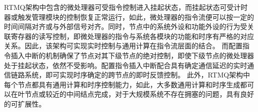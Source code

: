RTMQ架构中包含的微处理器可受指令控制进入挂起状态，而挂起状态可受计时器或触发管理模块的控制恢复正常运行，如此，微处理器的指令流便可以按一定的时间间隔对齐或与外部信号对齐。同时，节点中的系统外设和功能外设的行为受关联寄存器的读写控制，即微处理器的指令与系统各模块的功能和时序有严格的对应关系。因此，该架构可实现实时控制与通用计算在指令流层面的结合。
而配置指令插入中断的机制确保了节点对其下级节点的绝对控制，即使下级节点的微处理器处于挂起状态，依然不受影响。配置指令插入中断配合具有确定通信延迟的实时通信链路系统，即可实现时序确定的跨节点的即时反馈控制。
此外，RTMQ架构中每个节点都具有通用计算和时序控制能力，如此，大多数通用计算和时序生成都可以在叶节点或较近的中间结点完成，对于大规模系统不存在拥塞的问题，具有良好的可扩展性。









